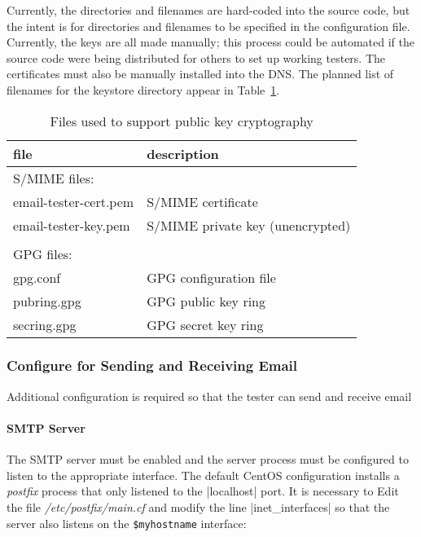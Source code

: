 \documentclass[preprint,3p,11pt]{elsarticle}
\begin{document}
Currently, the directories and filenames are hard-coded into the
source code, but the intent is for directories and filenames to be specified in the
configuration file. Currently, the keys are all made manually; this
process could be automated if the source code were being distributed
for others to set up working testers.  The certificates must also be
manually installed into the DNS. The planned list of filenames for the
keystore directory appear in Table~\ref{crypto-files}. 

\begin{table}
\begin{tabular}{|ll|}
\hline
file & description\\
\hline
\multicolumn{2}{|l|}{S/MIME files:}\\
email-tester-cert.pem & S/MIME certificate \\
email-tester-key.pem & S/MIME private key (unencrypted)\\
&\\
\multicolumn{2}{|l|}{GPG files:}\\
gpg.conf & GPG configuration file\\
pubring.gpg & GPG public key ring\\
secring.gpg & GPG secret key ring\\
\hline
\end{tabular}
\caption{Files used to support public key cryptography}\label{crypto-files}
\end{table}



\subsubsection{Configure for Sending and Receiving Email}

Additional configuration is required so that the tester can send and receive email

\paragraph{SMTP Server}

The SMTP server must be enabled and the server process must be
configured to listen to the appropriate interface. The default CentOS
configuration installs a \emph{postfix} process that only listened to
the |localhost| port. It is necessary to Edit the file
  \emph{/etc/postfix/main.cf} and modify the line |inet_interfaces| so
  that the server also listens on the \texttt{\$myhostname} interface:
\end{document}
